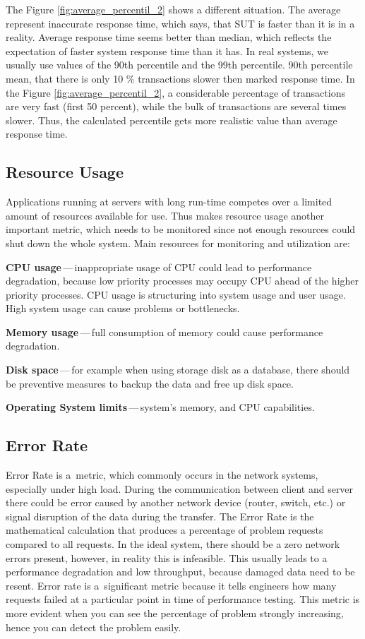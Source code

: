The Figure \ref{fig:average_percentil_2} shows a different situation. The average represent inaccurate response time, which says, that SUT is faster than it is in a reality. Average response time seems better than median, which reflects the expectation of faster system response time than it has. In real systems, we usually use values of the 90th percentile and the 99th percentile. 90th percentile mean, that there is only 10 \% transactions slower then marked response time. In the Figure \ref{fig:average_percentil_2}, a considerable percentage of transactions are very fast (first 50 percent), while the bulk of transactions are several times slower. Thus, the calculated percentile gets more realistic value than average response time.

\subsection{Resource Usage}
Applications running at servers with long run-time competes over a limited amount of resources available for use. Thus makes resource usage another important metric, which needs to be monitored since not enough resources could shut down the whole system. Main resources for monitoring and utilization are:

\begin{description}
	\setlength\itemsep{0em}
	\item \textbf{CPU usage}\,---\,inappropriate usage of CPU could lead to performance degradation, because low priority processes may occupy CPU ahead of the higher priority processes. CPU usage is structuring into system usage and user usage. High system usage can cause problems or bottlenecks.
	\item \textbf{Memory usage}\,---\,full consumption of memory could cause performance degradation.
	\item \textbf{Disk space}\,---\,for example when using storage disk as a database, there should be preventive measures to backup the data and free up disk space.
	\item \textbf{Operating System limits}\,---\,system's memory, and CPU capabilities.
\end{description}


\subsection{Error Rate}
Error Rate is a~metric, which commonly occurs in the network systems, especially under high load. During the communication between client and server there could be error caused by another network device (router, switch, etc.) or signal disruption of the data during the transfer. The Error Rate is the mathematical calculation that produces a percentage of problem requests compared to all requests. In the ideal system, there should be a zero network errors present, however, in reality this is infeasible. This usually leads to a performance degradation and low throughput, because damaged data need to be resent.
Error rate is a~significant metric because it tells engineers how many requests failed at a particular point in time of performance testing. This metric is more evident when you can see the percentage of problem strongly increasing, hence you can detect the problem easily.
